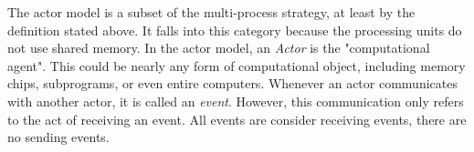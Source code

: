 \documentclass[12pt]{article}
\begin{document}
\begin{comment}
--------------------------------------------------------------------------------
Basic Background and Goals:

\begin{itemize}
    \item Actor model meant to address the problem that "Today's algorithmic programming languages were designed to express deterministic sequential algorithms".
    \item "The actor model emphasizes the communication occuring during computation" (17)
    \item "For the actor model... message pasing resembles mail service, so that messages may always be sent but are subject to variable delays en route to their destinations."
    \begin{itemize}
        \item This allows the actor model to be flexible. It can analyze distributed computer networks \textit{as well as} multiprocessors and programs.
    \end{itemize}
\end{itemize}
How communication is accomplished:
\begin{itemize}
    \item Each communication is described as a \textit{message} arriving at a computation agent, called an \textit{actor}. (17)
    \begin{itemize}
        \item Examples of actors include: memory chips, subprograms and entire computers (17)
    \end{itemize}
    \item Every communication between actors is consider an \textit{event}. Note that the actor model only refers to the receiving of a communication as an event. All events are receiving events, there are no sending events. (17).
\end{itemize}
--------------------------------------------------------------------------------
\end{comment}

The actor model is a subset of the multi-process strategy, at least by the definition stated above. It falls into this category because the processing units do not use shared memory. In the actor model, an \textit{Actor} is the "computational agent". This could be nearly any form of computational object, including memory chips, subprograms, or even entire computers. Whenever an actor communicates with another actor, it is called an \textit{event}. However, this communication only refers to the act of receiving an event. All events are consider receiving events, there are no sending events.
\end{document}
